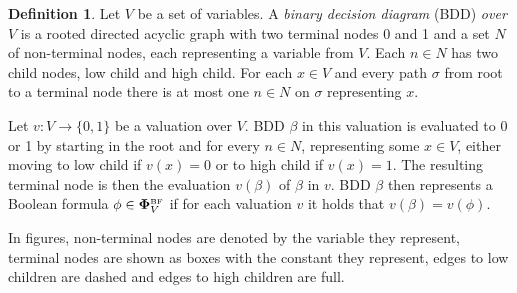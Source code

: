 \documentclass[
  digital, %
  twoside, %
  table,   %
  nolof,     %
  nolot,     %
]{fithesis3}
\theoremstyle{definition}
\newtheorem{definition}{Definition}
\theoremstyle{remark}
\newcommand{\BF}[1]{\mathbf{\Phi}_{#1}^{\normalfont{\text{\tiny BF}}}}
\begin{document}
\begin{definition}
  Let $V$ be a set of variables. A \emph{binary decision diagram} (BDD) \emph{over $V$} is a rooted directed acyclic graph with two terminal nodes 0 and 1 and a set $N$ of non-terminal nodes, each representing a variable from $V$. Each $n \in N$ has two child nodes, low child and high child. For each $x \in V$ and every path $\sigma$ from root to a terminal node there is at most one $n \in N$ on $\sigma$ representing $x$.
\end{definition}


Let $v\colon V \to \{0,1\}$ be a valuation over $V$. BDD $\beta$ in this valuation is evaluated to 0 or 1 by starting in the root and for every $n \in N$, representing some $x \in V$, either moving to low child if $v(x) = 0$ or to high child if $v(x) = 1$. The resulting terminal node is then the evaluation $v(\beta)$ of $\beta$ in $v$. BDD $\beta$ then represents a Boolean formula $\phi \in \BF{V}$ if for each valuation $v$ it holds that $v(\beta) = v(\phi)$.

In figures, non-terminal nodes are denoted by the variable they represent, terminal nodes are shown as boxes with the constant they represent, edges to low children are dashed and edges to high children are full.
\end{document}
